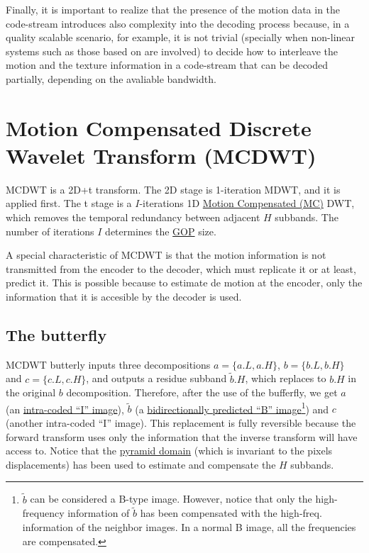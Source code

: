 Finally, it is important to realize that the presence of the motion
data in the code-stream introduces also complexity into the decoding
process because, in a quality scalable scenario, for example, it is
not trivial (specially when non-linear systems such as those based on
 are involved) to decide how to
interleave the motion and the texture information in a code-stream
that can be decoded partially, depending on the avaliable bandwidth.


\section{Motion Compensated Discrete Wavelet Transform (MCDWT)}
MCDWT is a 2D+t transform. The 2D stage is 1-iteration MDWT, and it is
applied first. The t stage is a $I$-iterations 1D
\href{https://en.wikipedia.org/wiki/Motion_compensation}{Motion
  Compensated (MC)} DWT, which removes the temporal redundancy between
adjacent $H$ subbands. The number of iterations $I$ determines the
\href{https://en.wikipedia.org/wiki/Group_of_pictures}{GOP} size.

A special characteristic of MCDWT is that the motion information is
not transmitted from the encoder to the decoder, which must replicate
it or at least, predict it. This is possible because to estimate de
motion at the encoder, only the information that it is accesible by
the decoder is used.

\subsection{The butterfly}
MCDWT butterly inputs three decompositions $a=\{a.L, a.H\}$, $b=\{b.L,
b.H\}$ and $c=\{c.L, c.H\}$, and outputs a residue subband
$\tilde{b}.H$, which replaces to $b.H$ in the original $b$
decomposition. Therefore, after the use of the bufferfly,
we get $a$ (an
\href{https://en.wikipedia.org/wiki/Video_compression_picture_types}{intra-coded
  ``I'' image}), $\tilde{b}$ (a
\href{https://en.wikipedia.org/wiki/Video_compression_picture_types}{bidirectionally
  predicted ``B'' image}\footnote{$\tilde{b}$ can be considered a
  B-type image. However, notice that only the high-frequency
  information of $\tilde{b}$ has been compensated with the
  high-freq. information of the neighbor images. In a normal B image,
  all the frequencies are compensated.}) and $c$ (another intra-coded
``I'' image). This replacement is fully reversible because the forward
transform uses only the information that the inverse transform will
have access to. Notice that the
\href{http://www.vtvt.ece.vt.edu/research/references/video/DCT_Video_Compression/Zhang92a.pdf}{pyramid
  domain} (which is invariant to the pixels displacements) has been
used to estimate and compensate the $H$ subbands.

